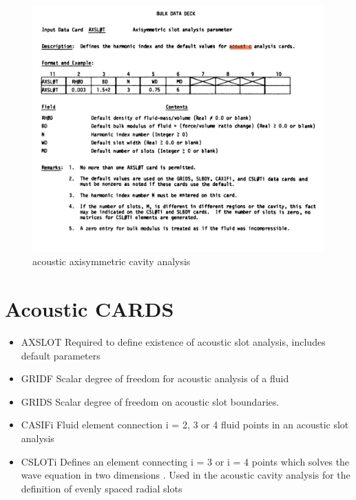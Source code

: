 \documentclass{article}
\begin{document}
\begin{figure}[h]
    \centering
\includegraphics[scale=0.35]{nastran_fig10}
    \caption{acoustic axisymmetric cavity analysis}
\end{figure}

\section{Acoustic CARDS}

\begin{itemize}

	\item AXSLOT Required to define existence of acoustic slot analysis, includes default parameters

	\item GRIDF Scalar degree of freedom for acoustic analysis of a fluid

	\item GRIDS Scalar degree of freedom on acoustic slot boundaries.

	\item CASIFi Fluid element connection i = 2, 3 or 4 fluid points in an acoustic slot analysis 
	\item CSLOTi Defines an element connecting i = 3 or i = 4 points which solves the wave equation
in two dimensions . Used in the acoustic cavity analysis for the definition of evenly spaced
radial slots 
\end{itemize}
\end{document}

